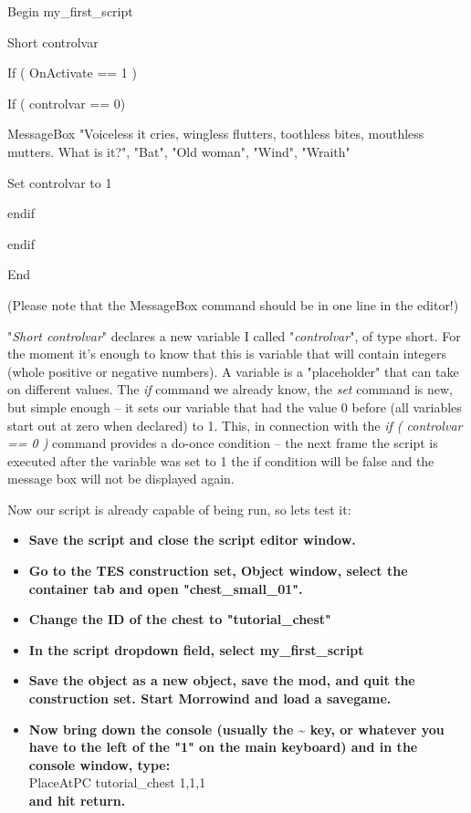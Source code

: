 \documentclass[
]{article}
\begin{document}
Begin my\_first\_script

Short controlvar

If ( OnActivate == 1 )

If ( controlvar == 0)

MessageBox "Voiceless it cries, wingless flutters, toothless bites,
mouthless mutters. What is it?", "Bat", "Old woman", "Wind", "Wraith"

Set controlvar to 1

endif

endif

End

(Please note that the MessageBox command should be in one line in the
editor!)

"\emph{Short controlvar}" declares a new variable I called
"\emph{controlvar}", of type short. For the moment it's enough to know
that this is variable that will contain integers (whole positive or
negative numbers). A variable is a "placeholder" that can take on
different values. The \emph{if} command we already know, the \emph{set}
command is new, but simple enough -- it sets our variable that had the
value 0 before (all variables start out at zero when declared) to 1.
This, in connection with the \emph{if ( controlvar == 0 )} command
provides a do-once condition -- the next frame the script is executed
after the variable was set to 1 the if condition will be false and the
message box will not be displayed again.

Now our script is already capable of being run, so lets test it:

\begin{itemize}
\item
  \textbf{Save the script and close the script editor window.}
\item
  \textbf{Go to the TES construction set, Object window, select the
  container tab and open "chest\_small\_01".}
\item
  \textbf{Change the ID of the chest to "tutorial\_chest"}
\item
  \textbf{In the script dropdown field, select my\_first\_script}
\item
  \textbf{Save the object as a new object, save the mod, and quit the
  construction set. Start Morrowind and load a savegame.}
\item
  \textbf{Now bring down the console (usually the \textasciitilde{} key,
  or whatever you have to the left of the "1" on the main keyboard) and
  in the console window, type:}\\
  PlaceAtPC tutorial\_chest 1,1,1\\
  \textbf{and hit return.}
\end{itemize}
\end{document}

